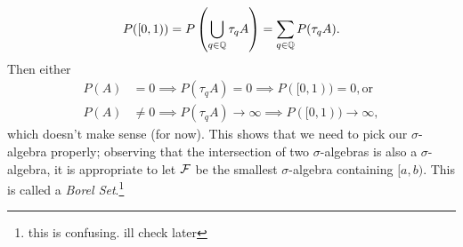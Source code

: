 \begin{itemize}
    \[ P([0, 1)) = P\left( \bigcup_{q \in \mathbb Q} \tau_q A \right) = \sum_{q \in \mathbb Q} P(\tau_q A). \]
    Then either
    \begin{align*}
        P(A) &= 0 \implies P(\tau_q A) = 0 \implies P([0, 1)) = 0, \text{or} \\
        P(A) &\neq 0 \implies P(\tau_q A) \to \infty \implies P([0, 1)) \to \infty,
    \end{align*}
    which doesn't make sense (for now). This shows that we need to pick our $\sigma$-algebra properly; observing that the intersection of two $\sigma$-algebras is also a $\sigma$-algebra, it is appropriate to let $\mathcal F$ be the smallest $\sigma$-algebra containing $[a, b)$. This is called a \textit{Borel Set}.\footnote{this is confusing. ill check later}
\end{itemize}
